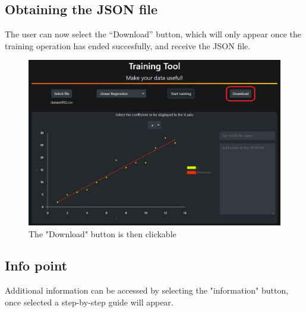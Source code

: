 \subsection{Obtaining the JSON file}
The user can now select the “Download” button, which will only appear once the training operation has ended succesfully, and receive the JSON file.
\begin{figure}[H]
\centering
\includegraphics[scale=0.65]{img/tool/tool_5_1_tool.JPG}
\caption{The "Download" button is then clickable}
\end{figure} 
\newpage
\subsection{Info point}
Additional information can be accessed by selecting the "information" button, once selected a step-by-step guide will appear.

